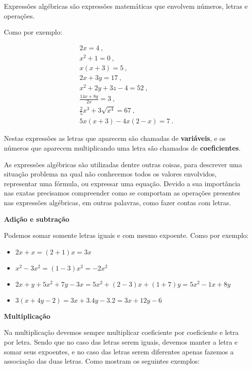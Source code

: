  Expressões algébricas são expressões matemáticas que envolvem números, letras e operações. 
 
 Como por exemplo: 
 
 \begin{eqnarray*}
  2x=4 \ ,\\
  x^2+1=0 \ ,\\
  x(x+3)=5 \ ,\\
  2x+3y=17 \ ,\\
  x^2 + 2y + 3z -4= 52 \ , \\
  \frac{14x + 8y}{2x}= 3 \ , \\
  \frac{2}{5}x^3 + 3\sqrt{x^4}= 67 \ , \\
  5x(x+3)-4x(2-x)=7 \ .
 \end{eqnarray*}
 
 Nestas expressões as letras que aparecem são chamadas de \textbf{variáveis}, e os números que aparecem multiplicando uma letra são chamados de \textbf{coeficientes}.
 
 As expressões algébricas são utilizadas dentre outras coisas, para descrever uma situação problema na qual não conhecemos todos os valores envolvidos, representar uma fórmula, ou expressar uma equação. Devido a sua importância nas exatas precisamos compreender como se comportam as operações presentes nas expressões algébricas, em outras palavras, como fazer contas com letras.
 
 \vskip0.3cm 
 
 \textbf{Adição e subtração}
 
 Podemos somar somente letras iguais e com mesmo expoente. Como por exemplo:

 \begin{itemize}
  \item $2x + x= (2+1)x= 3x$
  \item $x^2 - 3x^2= (1-3)x^2= -2x^2$
  \item $2x + y + 5x^2 + 7y - 3x= 5x^2 + (2-3)x + (1+7)y= 5x^2 - 1x + 8y$
  \item $3(x+ 4y-2)= 3x + 3.4y - 3.2= 3x + 12y - 6$
 \end{itemize}
 
  \vskip0.3cm 
 
 \textbf{Multiplicação}
 
 Na multiplicação devemos sempre multiplicar coeficiente por coeficiente e letra por letra. Sendo que no caso das letras serem iguais, devemos manter a letra e somar seus expoentes, e no caso das letras serem diferentes apenas fazemos a associação das duas letras. Como mostram os seguintes exemplos:
 
